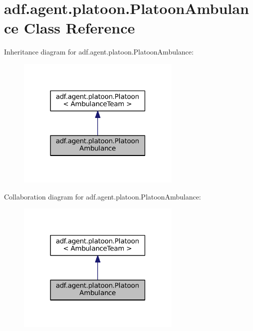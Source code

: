 \hypertarget{classadf_1_1agent_1_1platoon_1_1PlatoonAmbulance}{}\section{adf.\+agent.\+platoon.\+Platoon\+Ambulance Class Reference}
\label{classadf_1_1agent_1_1platoon_1_1PlatoonAmbulance}


Inheritance diagram for adf.\+agent.\+platoon.\+Platoon\+Ambulance\+:
\nopagebreak
\begin{figure}[H]
\begin{center}
\leavevmode
\includegraphics[width=222pt]{classadf_1_1agent_1_1platoon_1_1PlatoonAmbulance__inherit__graph}
\end{center}
\end{figure}


Collaboration diagram for adf.\+agent.\+platoon.\+Platoon\+Ambulance\+:
\nopagebreak
\begin{figure}[H]
\begin{center}
\leavevmode
\includegraphics[width=222pt]{classadf_1_1agent_1_1platoon_1_1PlatoonAmbulance__coll__graph}
\end{center}
\end{figure}
